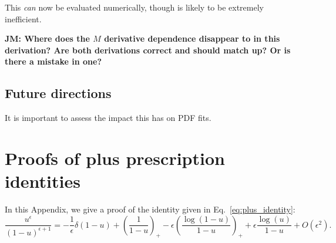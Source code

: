 \documentclass[withindex,glossary]{cam-thesis}
\newcommand{\JM}[1]{{\bf\color{cyan}JM: #1}}
\begin{document}
This \textit{can} now be evaluated numerically, though is likely to be extremely inefficient.

\JM{Where does the $M$ derivative dependence disappear to in this derivation? Are both derivations correct and should match up? Or is there a mistake in one?}



\section{Future directions}

It is important to assess the impact this has on PDF fits.






%

\renewcommand{\bibname}{References}
\cleardoublepage
{}
{}






\appendix

\chapter{Proofs of plus prescription identities}
\label{app:plus_prescription}
In this Appendix, we give a proof of the identity given in Eq.~\eqref{eq:plus_identity}:
\begin{equation}
\label{eq:plus_identity_2}
\frac{u^{\epsilon}}{(1-u)^{\epsilon+1}} = -\frac{1}{\epsilon} \delta(1-u) + \left( \frac{1}{1-u} \right)_+ - \epsilon \left( \frac{\log(1-u)}{1-u} \right)_+ + \epsilon \frac{\log(u)}{1-u} + O(\epsilon^2).
\end{equation}



\printthesisindex
\end{document}
